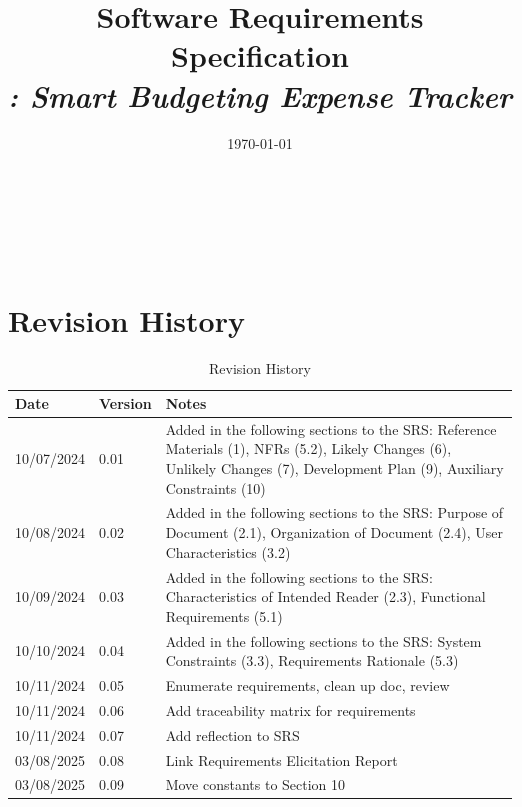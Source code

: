 \documentclass[12pt]{article}
\begin{document}
\title{Software Requirements Specification \\ \textit{\progname: Smart Budgeting Expense Tracker}} 
\author{\authname}
\date{\today}
	
\maketitle

~\newpage


\tableofcontents

\listoftables

~\newpage

\section*{Revision History}

\begin{table}[h!]
\centering
\caption{Revision History}
\begin{tabularx}{\textwidth}{p{3cm}p{2cm}X}
\toprule {\bf Date} & {\bf Version} & {\bf Notes}\\
\midrule
10/07/2024 & 0.01 & Added in the following sections to the SRS: Reference Materials (1), NFRs (5.2), Likely Changes (6), Unlikely Changes (7), Development Plan (9), Auxiliary Constraints (10)\\
10/08/2024 & 0.02 & Added in the following sections to the SRS: Purpose of Document (2.1), Organization of Document (2.4), User Characteristics (3.2)\\
10/09/2024 & 0.03 & Added in the following sections to the SRS: Characteristics of Intended Reader (2.3), Functional Requirements (5.1)\\
10/10/2024 & 0.04 & Added in the following sections to the SRS: System Constraints (3.3), Requirements Rationale (5.3)\\
10/11/2024 & 0.05 & Enumerate requirements, clean up doc, review\\
10/11/2024 & 0.06 & Add traceability matrix for requirements\\
10/11/2024 & 0.07 & Add reflection to SRS\\
03/08/2025 & 0.08 & Link Requirements Elicitation Report\\
03/08/2025 & 0.09 & Move constants to Section 10\\
\bottomrule 
\end{tabularx}
\end{table}
\end{document}
